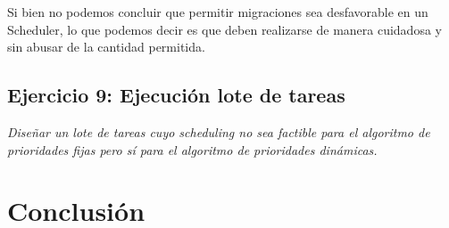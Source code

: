 \documentclass[a4paper]{article}
\begin{document}
 Si bien no podemos concluir que permitir migraciones sea desfavorable en un Scheduler, lo que podemos decir es que deben realizarse de manera cuidadosa y sin abusar de la cantidad permitida. 
 
\newpage
 \subsection{Ejercicio 9:  Ejecuci\'on lote de tareas}
\textit{Dise\~nar un lote de tareas cuyo scheduling no sea factible para el algoritmo de prioridades fijas pero s\'i para el algoritmo de prioridades din\'amicas.}

\newpage
 \section{Conclusión} 
\end{document}
